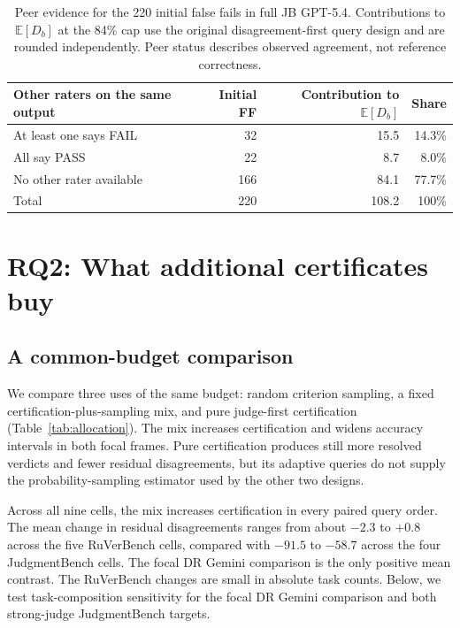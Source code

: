 \documentclass[10pt,letterpaper]{article}
\newcommand{\E}{\mathbb{E}}
\begin{document}
\begin{table}[t]
\centering\small
\caption{Peer evidence for the 220 initial false fails in full JB GPT-5.4. Contributions to $\E[D_b]$ at the 84\% cap use the original disagreement-first query design and are rounded independently. Peer status describes observed agreement, not reference correctness.}\label{tab:delay-peers}
\begin{tabular}{lrrr}
\toprule
Other raters on the same output & Initial FF & Contribution to $\E[D_b]$ & Share\\
\midrule
At least one says FAIL & 32 & 15.5 & 14.3\%\\
All say PASS & 22 & 8.7 & 8.0\%\\
No other rater available & 166 & 84.1 & 77.7\%\\
\midrule
Total & 220 & 108.2 & 100\%\\
\bottomrule
\end{tabular}
\end{table}

\section{RQ2: What additional certificates buy}\label{sec:rq2}
\subsection{A common-budget comparison}
We compare three uses of the same budget: random criterion sampling, a fixed certification-plus-sampling mix, and pure judge-first certification (Table~\ref{tab:allocation}). The mix increases certification and widens accuracy intervals in both focal frames. Pure certification produces still more resolved verdicts and fewer residual disagreements, but its adaptive queries do not supply the probability-sampling estimator used by the other two designs.

Across all nine cells, the mix increases certification in every paired query order. The mean change in residual disagreements ranges from about $-2.3$ to $+0.8$ across the five RuVerBench cells, compared with $-91.5$ to $-58.7$ across the four JudgmentBench cells. The focal DR Gemini comparison is the only positive mean contrast. The RuVerBench changes are small in absolute task counts. Below, we test task-composition sensitivity for the focal DR Gemini comparison and both strong-judge JudgmentBench targets.
\end{document}
